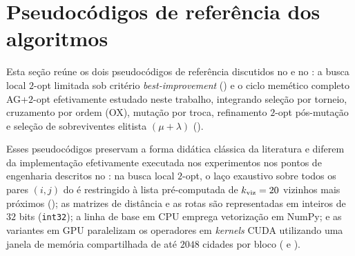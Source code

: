 \begin{table}[htbp]
\begin{tabeladensa}
\begin{tabular}{@{}lccccc@{}}
      \bottomrule
    \end{tabular}
  \end{tabeladensa}
\end{table}

\section{Pseudocódigos de referência dos algoritmos}\label{apendice-pseudocodigos}

Esta seção reúne os dois pseudocódigos de referência discutidos no  e no : a busca local \(2\)-opt limitada sob critério \emph{best-improvement} () e o ciclo memético completo AG+\(2\)-opt efetivamente estudado neste trabalho, integrando seleção por torneio, cruzamento por ordem (OX), mutação por troca, refinamento \(2\)-opt pós-mutação e seleção de sobreviventes elitista \((\mu + \lambda)\) ().

Esses pseudocódigos preservam a forma didática clássica da literatura e diferem da implementação efetivamente executada nos experimentos nos pontos de engenharia descritos no : na busca local \(2\)-opt, o laço exaustivo sobre todos os pares \((i, j)\) do  é restringido à lista pré-computada de \(k_{\text{viz}} = 20\) vizinhos mais próximos (); as matrizes de distância e as rotas são representadas em inteiros de \(32\) bits (\texttt{int32}); a linha de base em CPU emprega vetorização em NumPy; e as variantes em GPU paralelizam os operadores em \emph{kernels} CUDA utilizando uma janela de memória compartilhada de até \(2048\) cidades por bloco ( e ).

